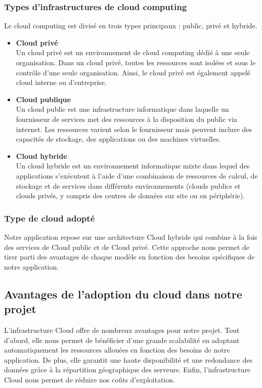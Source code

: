 \subsubsection{Types d'infrastructures de cloud computing}
\justifying
Le cloud computing est divisé en trois types principaux : public, privé et hybride.
\begin{itemize}[itemsep=2pt, parsep=2pt]
    \item \textbf{Cloud privé}\\ Un cloud privé est un environnement de cloud computing dédié à une seule organisation. Dans un cloud privé, toutes les ressources sont isolées et sous le contrôle d'une seule organisation. Ainsi, le cloud privé est également appelé cloud interne ou d'entreprise. \cite{cloudPrivé}
    \item \textbf{Cloud publique}\\ Un cloud public est une infrastructure informatique dans laquelle un fournisseur de services met des ressources à la disposition du public via internet. Les ressources varient selon le fournisseur mais peuvent inclure des capacités de stockage, des applications ou des machines virtuelles. \cite{CloudPublique}
    \item \textbf{Cloud hybride}\\ Un cloud hybride est un environnement informatique mixte dans lequel des applications s'exécutent à l'aide d'une combinaison de ressources de calcul, de stockage et de services dans différents environnements (clouds publics et clouds privés, y compris des centres de données sur site ou en périphérie). \cite{CloudHybride}
\end{itemize}

\subsubsection{Type de cloud adopté}
\justifying
Notre application repose sur une architecture Cloud hybride qui combine à la fois des services de Cloud public et de Cloud privé. Cette approche nous permet de tirer parti des avantages de chaque modèle en fonction des besoins spécifiques de notre application. 

\subsection{Avantages de l’adoption du cloud dans notre projet}
\justifying
L'infrastructure Cloud offre de nombreux avantages pour notre projet. Tout d'abord, elle nous permet de bénéficier d'une grande scalabilité en adaptant automatiquement les ressources allouées en fonction des besoins de notre application. De plus, elle garantit une haute disponibilité et une redondance des données grâce à la répartition géographique des serveurs. Enfin, l'infrastructure Cloud nous permet de réduire nos coûts d'exploitation. 

